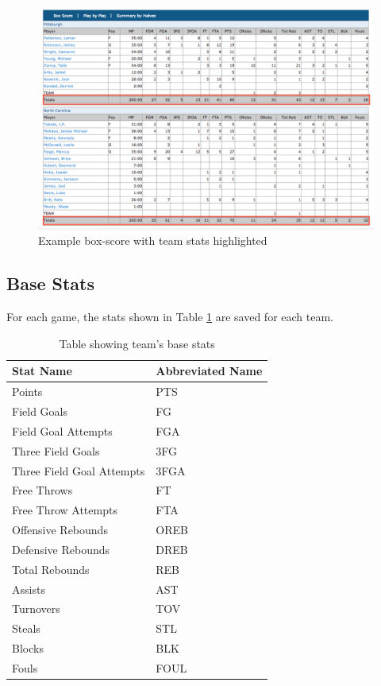 \documentclass[]{article}
\begin{document}
\begin{figure}[ht]
	\includegraphics[width=\linewidth]{box_score.png}
	\caption{Example box-score with team stats highlighted}
	\label{fig:ex_box_score}
\end{figure}

\subsection{Base Stats}

For each game, the stats shown in Table \ref{table:base_stats} are saved for each team.

\begin{table}[ht]
\centering
\begin{tabular}{@{}ll@{}}
\toprule
Stat Name                 & Abbreviated Name \\ \midrule
Points                    & PTS              \\
Field Goals               & FG               \\
Field Goal Attempts       & FGA              \\
Three Field Goals         & 3FG              \\
Three Field Goal Attempts & 3FGA             \\
Free Throws               & FT               \\
Free Throw Attempts       & FTA              \\
Offensive Rebounds        & OREB             \\
Defensive Rebounds        & DREB             \\
Total Rebounds            & REB              \\
Assists                   & AST              \\
Turnovers                 & TOV              \\
Steals                    & STL              \\
Blocks                    & BLK              \\
Fouls                     & FOUL             \\ \bottomrule
\end{tabular}
\caption{Table showing team's base stats}
\label{table:base_stats}
\end{table}
\end{document}
